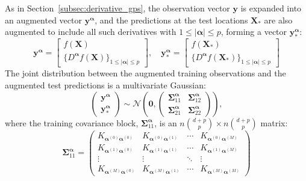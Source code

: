 \documentclass[12pt]{article}
\begin{document}
As in Section~\ref{subsec:derivative_gps}, the observation vector $\mathbf{y}$ is expanded into an augmented vector $\mathbf{y}^{\boldsymbol{\alpha}}$, and the predictions at the test locations $\mathbf{X}_*$ are also augmented to include all such derivatives with $1 \leq |\boldsymbol{\alpha}| \leq p$, forming a vector $\mathbf{y}^{\boldsymbol{\alpha}}_*$:
\begin{equation}
	\label{eqn:degp_aug_vectors}
	\mathbf{y}^{\boldsymbol{\alpha}} = \begin{bmatrix} f(\mathbf{X}) \\ \{D^{\boldsymbol{\alpha}} f(\mathbf{X})\}_{1 \leq |\boldsymbol{\alpha}| \leq p} \end{bmatrix}, \quad
	\mathbf{y}^{\boldsymbol{\alpha}}_* = \begin{bmatrix} f(\mathbf{X}_*) \\ \{D^{\boldsymbol{\alpha}} f(\mathbf{X}_*)\}_{1 \leq |\boldsymbol{\alpha}| \leq p}\end{bmatrix}
\end{equation}
The joint distribution between the augmented training observations and the augmented test predictions is a multivariate Gaussian:
\begin{equation}
	\label{eqn:full_dek_joint_dist}
	\begin{pmatrix}
		\mathbf{y}^{\boldsymbol{\alpha}} \\
		\mathbf{y}^{\boldsymbol{\alpha}}_*
	\end{pmatrix}
	\sim \mathcal{N}\left(
	\mathbf{0},
	\begin{pmatrix}
		\boldsymbol{\Sigma}^{\boldsymbol{\alpha}}_{11} & \boldsymbol{\Sigma}^{\boldsymbol{\alpha}}_{12} \\
		\boldsymbol{\Sigma}^{\boldsymbol{\alpha}}_{21} & \boldsymbol{\Sigma}^{\boldsymbol{\alpha}}_{22}
	\end{pmatrix}
	\right),
\end{equation}
where the training covariance block, $\boldsymbol{\Sigma}^{\boldsymbol{\alpha}}_{11}$, is an $n\binom{d + p}{p} \times n\binom{d + p}{p}$ matrix:
\begin{equation}
	\label{eqn:full_dek_S11}
	\boldsymbol{\Sigma}^{\boldsymbol{\alpha}}_{11} =
	\begin{pmatrix} 
		K_{\boldsymbol{\alpha}^{(0)}\boldsymbol{\alpha}^{(0)}} & K_{\boldsymbol{\alpha}^{(0)}\boldsymbol{\alpha}^{(1)}} & \cdots & K_{\boldsymbol{\alpha}^{(0)}\boldsymbol{\alpha}^{(M)}} \\ 
		K_{\boldsymbol{\alpha}^{(1)}\boldsymbol{\alpha}^{(0)}} & K_{\boldsymbol{\alpha}^{(1)}\boldsymbol{\alpha}^{(1)}} & \cdots & K_{\boldsymbol{\alpha}^{(1)}\boldsymbol{\alpha}^{(M)}} \\ 
		\vdots & \vdots & \ddots & \vdots \\ 
		K_{\boldsymbol{\alpha}^{(M)}\boldsymbol{\alpha}^{(0)}} & K_{\boldsymbol{\alpha}^{(M)}\boldsymbol{\alpha}^{(1)}} & \cdots & K_{\boldsymbol{\alpha}^{(M)}\boldsymbol{\alpha}^{(M)}} 
	\end{pmatrix}
\end{equation}
\end{document}
